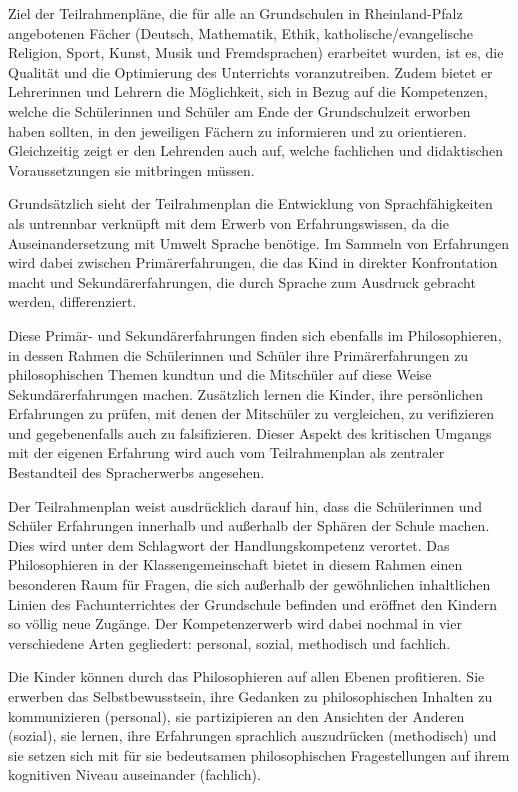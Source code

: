 Ziel der Teilrahmenpläne, die für alle an Grundschulen in Rheinland-Pfalz angebotenen Fächer (Deutsch, Mathematik, Ethik, katholische/evangelische Religion, Sport, Kunst, Musik und Fremdsprachen) erarbeitet wurden, ist es, die Qualität und die Optimierung des Unterrichts voranzutreiben. 
Zudem bietet er Lehrerinnen und Lehrern die Möglichkeit, sich in Bezug auf die Kompetenzen, welche die Schülerinnen und Schüler am Ende der Grundschulzeit erworben haben sollten, in den jeweiligen Fächern zu informieren und zu orientieren. 
Gleichzeitig zeigt er den Lehrenden auch auf, welche fachlichen und didaktischen Voraussetzungen sie mitbringen müssen.

Grundsätzlich sieht der Teilrahmenplan die Entwicklung von Sprachfähigkeiten als untrennbar verknüpft mit dem Erwerb von Erfahrungswissen, da die Auseinandersetzung mit Umwelt Sprache benötige\cite[S.\,6]{MBFJ06}.
Im Sammeln von Erfahrungen wird dabei zwischen Primärerfahrungen, die das Kind in direkter Konfrontation macht und Sekundärerfahrungen, die durch Sprache zum Ausdruck gebracht werden, differenziert. 

Diese Primär- und Sekundärerfahrungen finden sich ebenfalls im Philosophieren, in dessen Rahmen die Schülerinnen und Schüler ihre Primärerfahrungen zu philosophischen Themen kundtun und die Mitschüler auf diese Weise Sekundärerfahrungen machen. 
Zusätzlich lernen die Kinder, ihre persönlichen Erfahrungen zu prüfen, mit denen der Mitschüler zu vergleichen, zu verifizieren und gegebenenfalls auch zu falsifizieren. 
Dieser Aspekt des kritischen Umgangs mit der eigenen Erfahrung wird auch vom Teilrahmenplan als zentraler Bestandteil des Spracherwerbs angesehen.

Der Teilrahmenplan weist ausdrücklich darauf hin, dass die Schülerinnen und Schüler Erfahrungen innerhalb und außerhalb der Sphären der Schule machen. 
Dies wird unter dem Schlagwort der \glqq Handlungskompetenz\grqq{} verortet. 
Das Philosophieren in der Klassengemeinschaft bietet in diesem Rahmen einen besonderen Raum für Fragen, die sich außerhalb der gewöhnlichen inhaltlichen Linien des Fachunterrichtes der Grundschule befinden und eröffnet den Kindern so völlig neue Zugänge. 
Der Kompetenzerwerb wird dabei nochmal in vier verschiedene Arten gegliedert: personal, sozial, methodisch und fachlich. 

Die Kinder können durch das Philosophieren auf allen Ebenen profitieren. 
Sie erwerben das Selbstbewusstsein, ihre Gedanken zu philosophischen Inhalten zu kommunizieren (personal), sie partizipieren an den Ansichten der Anderen (sozial), sie lernen, ihre Erfahrungen sprachlich auszudrücken (methodisch) und sie setzen sich mit für sie bedeutsamen philosophischen Fragestellungen auf ihrem kognitiven Niveau auseinander (fachlich).

